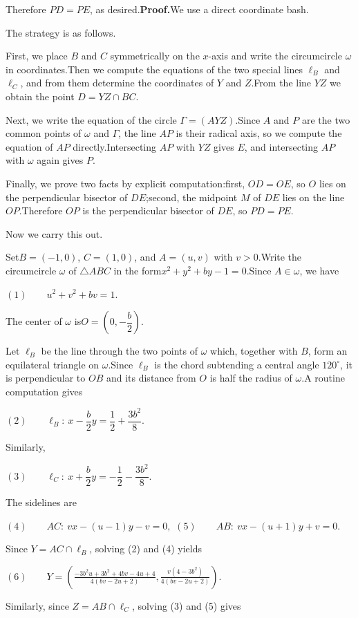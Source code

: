 \begin{enumerate}
 Therefore $PD=PE$, as desired.\textbf{Proof.}We use a direct coordinate bash.

 The strategy is as follows.

 First, we place $B$ and $C$ symmetrically on the $x$-axis and write the circumcircle $\omega$ in coordinates.Then we compute the equations of the two special lines $\ell_B$ and $\ell_C$, and from them determine the coordinates of $Y$ and $Z$.From the line $YZ$ we obtain the point $D=YZ\cap BC$.

 Next, we write the equation of the circle $\Gamma=(AYZ)$.Since $A$ and $P$ are the two common points of $\omega$ and $\Gamma$, the line $AP$ is their radical axis, so we compute the equation of $AP$ directly.Intersecting $AP$ with $YZ$ gives $E$, and intersecting $AP$ with $\omega$ again gives $P$.

 Finally, we prove two facts by explicit computation:first, $OD=OE$, so $O$ lies on the perpendicular bisector of $DE$;second, the midpoint $M$ of $DE$ lies on the line $OP$.Therefore $OP$ is the perpendicular bisector of $DE$, so $PD=PE$.

 Now we carry this out.

 Set$B=(-1,0)$, $C=(1,0)$, and $A=(u,v)$ with $v>0$.Write the circumcircle $\omega$ of $\triangle ABC$ in the form$x^2+y^2+by-1=0$.Since $A\in\omega$, we have

 $(1)\qquad u^2+v^2+bv=1$.

 The center of $\omega$ is$O=\left(0,-\dfrac b2\right)$.

 Let $\ell_B$ be the line through the two points of $\omega$ which, together with $B$, form an equilateral triangle on $\omega$.Since $\ell_B$ is the chord subtending a central angle $120^\circ$, it is perpendicular to $OB$ and its distance from $O$ is half the radius of $\omega$.A routine computation gives

 $(2)\qquad \ell_B:\ x-\dfrac b2 y=\dfrac12+\dfrac{3b^2}{8}$.

 Similarly,

 $(3)\qquad \ell_C:\ x+\dfrac b2 y=-\dfrac12-\dfrac{3b^2}{8}$.

 The sidelines are

 $(4)\qquad AC:\ vx-(u-1)y-v=0,$
$(5)\qquad AB:\ vx-(u+1)y+v=0.$

 Since $Y=AC\cap \ell_B$, solving (2) and (4) yields

 $(6)\qquad Y=\left( \frac{-3b^2u+3b^2+4bv-4u+4}{4(bv-2u+2)}, \frac{v(4-3b^2)}{4(bv-2u+2)} \right).$

 Similarly, since $Z=AB\cap \ell_C$, solving (3) and (5) gives


\end{enumerate}
